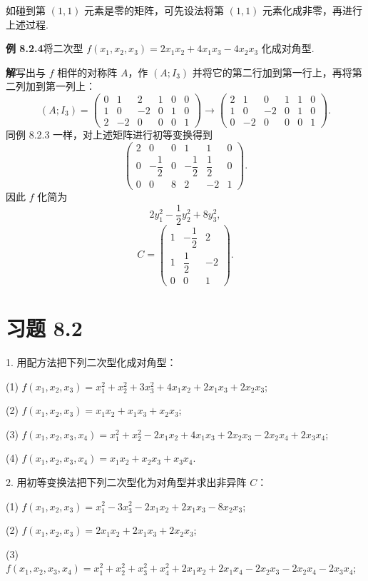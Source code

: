 \documentclass[UTF8, 12pt, fontset=fandol, oneside]{ctexart}
\begin{document}
如碰到第 $(1,1)$ 元素是零的矩阵，可先设法将第 $(1,1)$ 元素化成非零，再进行上述过程.

\noindent\textbf{例 8.2.4}\quad 将二次型 $f(x_1,x_2,x_3)=2x_1x_2+4x_1x_3-4x_2x_3$ 化成对角型.

\noindent\textbf{解}\quad 写出与 $f$ 相伴的对称阵 $A$，作 $(A;I_3)$ 并将它的第二行加到第一行上，再将第二列加到第一列上：
\[
(A;I_3)=
\left(\begin{array}{ccc|ccc}
0&1&2&1&0&0\\
1&0&-2&0&1&0\\
2&-2&0&0&0&1
\end{array}\right)
\rightarrow
\left(\begin{array}{ccc|ccc}
2&1&0&1&1&0\\
1&0&-2&0&1&0\\
0&-2&0&0&0&1
\end{array}\right).
\]
同例 8.2.3 一样，对上述矩阵进行初等变换得到
\[
\left(\begin{array}{ccc|ccc}
2&0&0&1&1&0\\
0&-\dfrac12&0&-\dfrac12&\dfrac12&0\\
0&0&8&2&-2&1
\end{array}\right).
\]
因此 $f$ 化简为
\[
2y_1^2-\frac12y_2^2+8y_3^2,
\]
\[
C=\left(\begin{array}{ccc}
1&-\dfrac12&2\\
1&\dfrac12&-2\\
0&0&1
\end{array}\right).
\]

\section*{习题 8.2}

1. 用配方法把下列二次型化成对角型：

(1) $f(x_1,x_2,x_3)=x_1^2+x_2^2+3x_3^2+4x_1x_2+2x_1x_3+2x_2x_3$;

(2) $f(x_1,x_2,x_3)=x_1x_2+x_1x_3+x_2x_3$;

(3) $f(x_1,x_2,x_3,x_4)=x_1^2+x_2^2-2x_1x_2+4x_1x_3+2x_2x_3-2x_2x_4+2x_3x_4$;

(4) $f(x_1,x_2,x_3,x_4)=x_1x_2+x_2x_3+x_3x_4$.

2. 用初等变换法把下列二次型化为对角型并求出非异阵 $C$：

(1) $f(x_1,x_2,x_3)=x_1^2-3x_3^2-2x_1x_2+2x_1x_3-8x_2x_3$;

(2) $f(x_1,x_2,x_3)=2x_1x_2+2x_1x_3+2x_2x_3$;

(3) $f(x_1,x_2,x_3,x_4)=x_1^2+x_2^2+x_3^2+x_4^2+2x_1x_2+2x_1x_4-2x_2x_3-2x_2x_4-2x_3x_4$;
\end{document}
